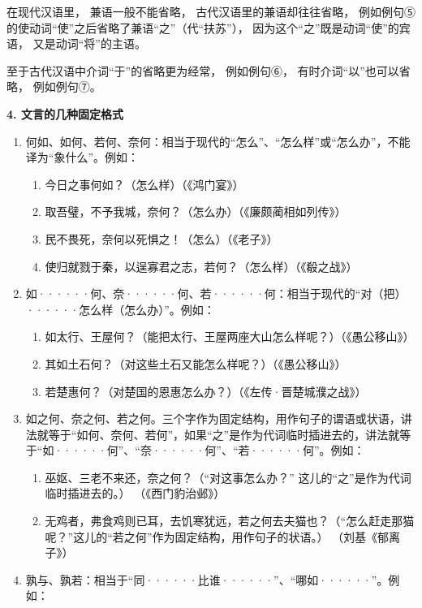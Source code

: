 在现代汉语里，
兼语一般不能省略，
古代汉语里的兼语却往往省略，
例如例句⑤的使动词“使”之后省略了兼语“之”（代“扶苏”），
因为这个“之”既是动词“使”的宾语，
又是动词“将”的主语。

至于古代汉语中介词“于”的省略更为经常，
例如例句⑥，
有时介词“以”也可以省略，
例如例句⑦。

\textbf{4. 文言的几种固定格式}

\begin{enumerate}
	\item 何如、如何、若何、奈何：相当于现代的“怎么”、“怎么样”或“怎么办”，不能译为“象什么”。例如：
	\begin{enumerate}[label=\textcircled{\arabic*}]
		\item 今日之事何如？（怎么样）（《鸿门宴》）
		\item 取吾璧，不予我城，奈何？（怎么办）（《廉颇蔺相如列传》）
		\item 民不畏死，奈何以死惧之！（怎么）（《老子》）
		\item 使归就戮于秦，以逞寡君之志，若何？（怎么样）（《殽之战》）
	\end{enumerate}
	\item 如······何、奈······何、若······何：相当于现代的“对（把）······怎么样（怎么办）”。例如：
	\begin{enumerate}[label=\textcircled{\arabic*}]
		\item 如太行、王屋何？（能把太行、王屋两座大山怎么样呢？）（《愚公移山》）
		\item 其如土石何？（对这些土石又能怎么样呢？）（《愚公移山》）
		\item 若楚惠何？（对楚国的恩惠怎么办？）（《左传·晋楚城濮之战》）
	\end{enumerate}
	\item 如之何、奈之何、若之何。三个字作为固定结构，用作句子的谓语或状语，讲法就等于“如何、奈何、若何”，如果“之”是作为代词临时插进去的，讲法就等于“如······何”、“奈······何”、“若······何”。例如：
	\begin{enumerate}[label=\textcircled{\arabic*}]
		\item 巫妪、三老不来还，奈之何？（“对这事怎么办？” 这儿的“之”是作为代词临时插进去的。） （《西门豹治邺》）
		\item 无鸡者，弗食鸡则已耳，去饥寒犹远，若之何去夫猫也？（“怎么赶走那猫呢？”这儿的“若之何”作为固定结构，用作句子的状语。） （刘基《郁离子》）
	\end{enumerate}
	\item 孰与、孰若：相当于“同······比谁······”、“哪如······”。例如：
	\begin{enumerate}[label=\textcircled{\arabic*}]

\end{enumerate}
\end{enumerate}
